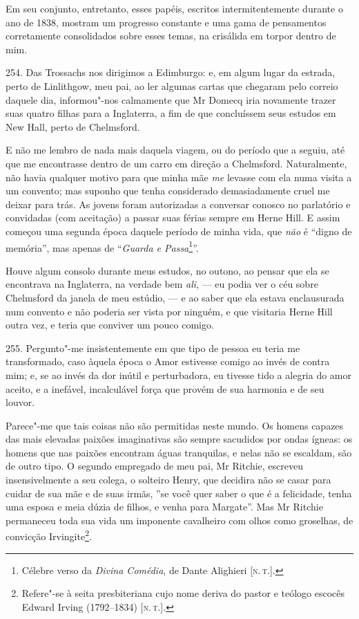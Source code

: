 Em seu conjunto, entretanto, esses papéis, escritos intermitentemente
durante o ano de 1838, mostram um progresso constante e uma gama de
pensamentos corretamente consolidados sobre esses temas, na crisálida em
torpor dentro de mim.

254. Das Trossachs nos dirigimos a Edimburgo: e, em algum lugar da
estrada, perto de Linlithgow, meu pai, ao ler algumas cartas que
chegaram pelo correio daquele dia, informou"-nos calmamente que Mr Domecq
iria novamente trazer suas quatro filhas para a Inglaterra, a fim de que
concluíssem seus estudos em New Hall, perto de Chelmsford.

E não me lembro de nada mais daquela viagem, ou do período que a seguiu,
até que me encontrasse dentro de um carro em direção a Chelmsford.
Naturalmente, não havia qualquer motivo para que minha mãe \emph{me}
levasse com ela numa visita a um convento; mas suponho que tenha
considerado demasiadamente cruel me deixar para trás. As jovens foram
autorizadas a conversar conosco no parlatório e convidadas (com
aceitação) a passar suas férias sempre em Herne Hill. E assim começou
uma segunda época daquele período de minha vida, que \emph{não} é
``digno de memória'', mas apenas de ``\emph{Guarda e Passa}\footnote{Célebre
  verso da \emph{Divina Comédia}, de Dante Alighieri {[}\textsc{n.\,t.}{]}.}''.

Houve algum consolo durante meus estudos, no outono, ao pensar que ela
se encontrava na Inglaterra, na verdade bem \emph{ali}, --- eu podia ver
o céu sobre Chelmsford da janela de meu estúdio, --- e ao saber que ela
estava enclausurada num convento e não poderia ser vista por ninguém, e
que visitaria Herne Hill outra vez, e teria que conviver um pouco
comigo.

255. Pergunto"-me insistentemente em que tipo de pessoa eu teria me
transformado, caso àquela época o Amor estivesse comigo ao invés de
contra mim; e, se ao invés da dor inútil e perturbadora, eu tivesse tido
a alegria do amor aceito, e a inefável, incalculável força que provém de
sua harmonia e de seu louvor.

Parece"-me que tais coisas não são permitidas neste mundo. Os homens
capazes das mais elevadas paixões imaginativas são sempre sacudidos por
ondas ígneas: os homens que nas paixões encontram águas tranquilas, e
nelas não se escaldam, são de outro tipo. O segundo empregado de meu
pai, Mr Ritchie, escreveu insensivelmente a seu colega, o solteiro
Henry, que decidira não se casar para cuidar de sua mãe e de suas irmãs,
''se você quer saber o que é a felicidade, tenha uma esposa e meia dúzia
de filhos, e venha para Margate''. Mas Mr Ritchie permaneceu toda sua
vida um imponente cavalheiro com olhos como groselhas, de convicção
Irvingite\footnote{Refere"-se à seita presbiteriana cujo nome deriva do
  pastor e teólogo escocês Edward Irving (1792--1834) {[}\textsc{n.\,t.}{]}.}.

